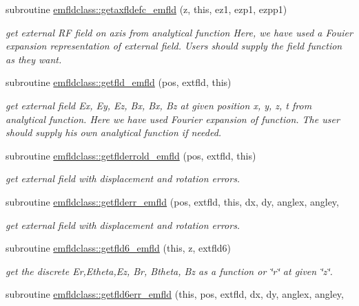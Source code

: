 \begin{DoxyCompactItemize}
subroutine \mbox{\hyperlink{namespaceemfldclass_ae77f42a7f667c3dd902df1d26480e602}{emfldclass\+::getaxfldefc\+\_\+emfld}} (z, this, ez1, ezp1, ezpp1)
\begin{DoxyCompactList}\small\item\em get external RF field on axis from analytical function Here, we have used a Fouier expansion representation of external field. Users should supply the field function as they want. \end{DoxyCompactList}\item 
subroutine \mbox{\hyperlink{namespaceemfldclass_aa0023b4b2c7a17c75becc20eeb9be23c}{emfldclass\+::getfld\+\_\+emfld}} (pos, extfld, this)
\begin{DoxyCompactList}\small\item\em get external field Ex, Ey, Ez, Bx, Bx, Bz at given position x, y, z, t from analytical function. Here we have used Fourier expansion of function. The user should supply his own analytical function if needed. \end{DoxyCompactList}\item 
subroutine \mbox{\hyperlink{namespaceemfldclass_a828e010a02ef4b8d9806f8d4c3053126}{emfldclass\+::getflderrold\+\_\+emfld}} (pos, extfld, this)
\begin{DoxyCompactList}\small\item\em get external field with displacement and rotation errors. \end{DoxyCompactList}\item 
subroutine \mbox{\hyperlink{namespaceemfldclass_ad7628b9fdaf5e839e55f71c3f8678c11}{emfldclass\+::getflderr\+\_\+emfld}} (pos, extfld, this, dx, dy, anglex, angley,
\begin{DoxyCompactList}\small\item\em get external field with displacement and rotation errors. \end{DoxyCompactList}\item 
subroutine \mbox{\hyperlink{namespaceemfldclass_a7eb67a0a1ce6ea3f37b4c55e40048f4a}{emfldclass\+::getfld6\+\_\+emfld}} (this, z, extfld6)
\begin{DoxyCompactList}\small\item\em get the discrete Er,Etheta,Ez, Br, Btheta, Bz as a function or \char`\"{}r\char`\"{} at given \char`\"{}z\char`\"{}. \end{DoxyCompactList}\item 
subroutine \mbox{\hyperlink{namespaceemfldclass_ab5c872006557986fafd6080666ca68f1}{emfldclass\+::getfld6err\+\_\+emfld}} (this, pos, extfld, dx, dy, anglex, angley,

\end{DoxyCompactItemize}
